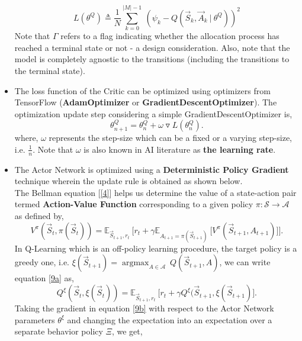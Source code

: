 \documentclass{article}
\DeclareMathOperator*{\argmax}{argmax}
\begin{document}
\begin{itemize}
    \begin{equation}
        L(\theta^{Q}) \triangleq \frac{1}{N} \sum_{k=0}^{|M|-1}\ (\psi_k - Q(\vec{S}_{k}, \vec{A}_{k}\ |\ \theta^{Q}))^2
    \end{equation}
    Note that $\Gamma$ refers to a flag indicating whether the allocation process has reached a terminal state or not - a design consideration. Also, note that the model is completely agnostic to the transitions (including the transitions to the terminal state).
    \item The loss function of the Critic can be optimized using optimizers from TensorFlow (\textbf{AdamOptimizer} or \textbf{GradientDescentOptimizer}). The optimization update step considering a simple GradientDescentOptimizer is,
    \begin{equation}
        \theta^{Q}_{n+1} = \theta^{Q}_{n} + \omega \triangledown L(\theta^{Q}_{n}).
    \end{equation}
    where, $\omega$ represents the step-size which can be a fixed or a varying step-size, i.e. $\frac{1}{n}$. Note that $\omega$ is also known in AI literature as \textbf{the learning rate}.
    \item The Actor Network is optimized using a \textbf{Deterministic Policy Gradient} technique wherein the update rule is obtained as shown below.
    \\The Bellman equation [\ref{4}] helps us determine the value of a state-action pair termed \textbf{Action-Value Function} corresponding to a given policy $\pi: \mathcal{S} \rightarrow \mathcal{A}$ as defined by,
    \begin{equation}\label{9a}
        V^{\pi}(\vec{S}_t, \pi(\vec{S}_t)) = \mathbb{E}_{\vec{S}_{t+1}, r_{t}}\ \Big[r_t + \gamma \mathbb{E}_{A_{t+1} = \pi(\vec{S}_{t+1})}\ \Big[ V^{\pi}(\vec{S}_{t+1}, A_{t+1})\Big]\Big].
    \end{equation}
    In Q-Learning which is an off-policy learning procedure, the target policy is a greedy one, i.e. $\xi(\vec{S}_{t+1}) = \argmax_{A \in \mathcal{A}}\ Q(\vec{S}_{t+1}, A)$, we can write equation \eqref{9a} as,
    \begin{equation}\label{9b}
        Q^{\xi}(\vec{S}_t, \xi(\vec{S}_t)) = \mathbb{E}_{\vec{S}_{t+1}, r_{t}}\ \Big[r_t + \gamma Q^{\xi}(\vec{S}_{t+1}, \xi(\vec{S}_{t+1})\Big].
    \end{equation}
    Taking the gradient in equation \eqref{9b} with respect to the Actor Network parameters $\theta^{\xi}$ and changing the expectation into an expectation over a separate behavior policy $\Xi$, we get,

\end{itemize}
\end{document}
